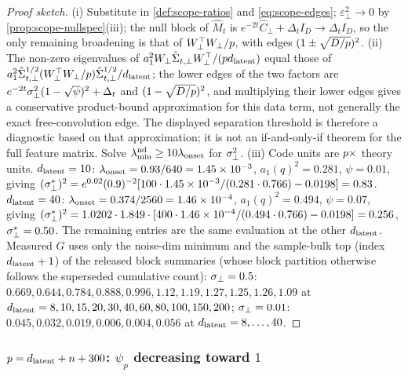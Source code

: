 \begin{proof}[Proof sketch]
(i) Substitute in \cref{def:scope-ratios} and \eqref{eq:scope-edges}; $\varepsilon_\perp^2\to0$ by \cref{prop:scope-nullspec}(iii); the null block of $\hat M_t$ is $e^{-2t}\hat C_\perp+\Delta_tI_D\to\Delta_tI_D$, so the only remaining broadening is that of $W_\perp^\top W_\perp/p$, with edges $(1\pm\sqrt{D/p})^2$. (ii) The non-zero eigenvalues of $a_1^2W_\perp\hat\Sigma_{t,\perp}W_\perp^\top/(pd_{\mathrm{latent}})$ equal those of $a_1^2\hat\Sigma_{t,\perp}^{1/2}(W_\perp^\top W_\perp/p)\hat\Sigma_{t,\perp}^{1/2}/d_{\mathrm{latent}}$; the lower edges of the two factors are $e^{-2t}\sigma_{\perp}^2(1-\sqrt\psi)^2+\Delta_t$ and $(1-\sqrt{D/p})^2$, and multiplying their lower edges gives a conservative product-bound approximation for this data term, not generally the exact free-convolution edge. The displayed separation threshold is therefore a diagnostic based on that approximation; it is not an if-and-only-if theorem for the full feature matrix. Solve $\lambda^{\rm nd}_{\min}\ge10\lambda_{\rm onset}$ for $\sigma_{\perp}^2$. (iii) Code units are $p\times$ theory units. $d_{\mathrm{latent}}=10$: $\lambda_{\rm onset}=0.93/640=1.45\times10^{-3}$, $a_1(q)^2=0.281$, $\psi=0.01$, giving $(\sigma_{\perp}^*)^2=e^{0.02}(0.9)^{-2}[100\cdot1.45\times10^{-3}/(0.281\cdot0.766)-0.0198]=0.83$. $d_{\mathrm{latent}}=40$: $\lambda_{\rm onset}=0.374/2560=1.46\times10^{-4}$, $a_1(q)^2=0.494$, $\psi=0.07$, giving $(\sigma_{\perp}^*)^2=1.0202\cdot1.849\cdot[400\cdot1.46\times10^{-4}/(0.494\cdot0.766)-0.0198]=0.256$, $\sigma_{\perp}^*=0.50$. The remaining entries are the same evaluation at the other $d_{\mathrm{latent}}$. Measured $G$ uses only the noise-dim minimum and the sample-bulk top (index $d_{\mathrm{latent}}+1$) of the released block summaries (whose block partition otherwise follows the superseded cumulative count): $\sigma_{\perp}=0.5$: $0.669,0.644,0.784,0.888,0.996,1.12,1.19,1.27,1.25,1.26,1.09$ at $d_{\mathrm{latent}}=8,10,15,20,30,40,60,80,100,150,200$; $\sigma_{\perp}=0.01$: $0.045,0.032,0.019,0.006,0.004,0.056$ at $d_{\mathrm{latent}}=8,\dots,40$.
\end{proof}

\subsubsection{$p=d_{\mathrm{latent}}+n+300$: $\psi_p$ decreasing toward $1$}


